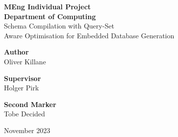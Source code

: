 
\newcommand{\titlecredit}[2]{\begin{minipage}[t]{.3\textwidth}
        \Large
        \centering
        \textbf{#1}
        \\ \vspace{1mm} #2
    \end{minipage}}

\begin{titlepage}
    \begin{center}
        \vspace{4cm}
        \Huge
        \textbf{MEng Individual Project}
        \huge
        \\ \vspace{1mm}
        \textbf{Department of Computing}
        \\ \vspace{60mm}
        \HUGE Schema Compilation with Query-Set \\ Aware Optimisation for Embedded Database Generation
        \vspace{40mm}
        \normalsize
        \\ \vspace{3cm}
        \begin{center}
            \titlecredit{Author}{Oliver Killane}
            \titlecredit{Supervisor}{Holger Pirk}
            \titlecredit{Second Marker}{Tobe Decided}
        \end{center}
        \vspace{5mm}
         November 2023
    \end{center}
\end{titlepage}